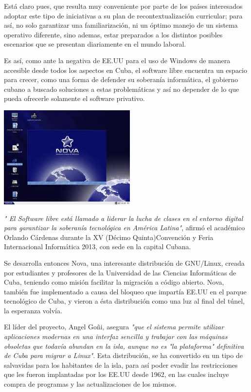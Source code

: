 Está claro pues, que resulta muy conveniente por parte de los países interesados adoptar este tipo de iniciativas a su plan de recontextualización curricular; para así, no solo 
garantizar una familiarización, ni un óptimo manejo de un sistema operativo diferente, sino ademas, estar preparados a los distintos posibles escenarios que se presentan 
diariamente en el mundo laboral.                                                                       
                                                                                                                                 
Es así, como ante la negativa de EE.UU para el uso de Windows de manera accesible desde todos los aspectos en Cuba, el software libre encuentra un espacio para crecer, como una 
forma de defender su soberanía informática, el gobierno cubano a buscado soluciones a estas problemáticas y así no depender de lo que pueda ofrecerle solamente el software 
privativo. 

\includegraphics[scale=0.6]{img/cp03/img0302.png}

\textit{" El Software libre está llamado a liderar la lucha de clases en el entorno digital para garantizar la soberanía tecnológica en América Latina"}, afirmó el académico 
Orlando Cárdenas durante la XV (Décimo Quinta)Convención y Feria Internacional Informática 2013, con sede en la capital Cubana.

Se desarrolla entonces Nova, una interesante distribución de GNU/Linux,  creada por estudiantes y profesores de la Universidad de las Ciencias Informáticas de Cuba, teniendo como 
misión facilitar la migración a código abierto. Nova, también fue implementado a causa del bloqueo que impartía EE.UU en el parque tecnológico de Cuba, y vieron a ésta 
distribución como una luz al final del túnel, la esperanza volvía.

El líder del proyecto, Angel Goñi, asegura \textit{"que el sistema permite utilizar aplicaciones modernas en una interfaz sencilla y trabajar con las máquinas obsoletas que 
todavía abundan en la isla, aunque no es "la plataforma" definitiva de Cuba para migrar a Linux"}. Esta distribución, se ha convertido en un tipo de salvavidas para los 
habitantes de la isla, para así poder evadir las restricciones que les fueron implantadas por los EE.UU desde 1962, en las cuales incluye compra de programas y las 
actualizaciones de los mismos.                          
                                               
